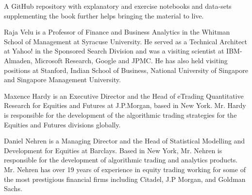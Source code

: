 \noindent A GitHub repository with explanatory and exercise notebooks and data-sets supplementing the book further helps bringing the material to live. \twomedskip


\noindent Raja Velu is a Professor of Finance and Business Analytics in the Whitman School of Management at Syracuse University. He served as a Technical Architect at Yahoo! in the Sponsored Search Division and was a visiting scientist at IBM-Almaden, Microsoft Research, Google and JPMC. He has also held visiting positions at Stanford, Indian School of Business, National University of Singapore and Singapore Management University. \medskip

\noindent Maxence Hardy is an Executive Director and the Head of eTrading Quantitative Research for Equities and Futures at J.P.Morgan, based in New York. Mr. Hardy is responsible for the development of the algorithmic trading strategies for the Equities and Futures divisions globally. \medskip

\noindent Daniel Nehren is a Managing Director and the Head of Statistical Modelling and Development for Equities at Barclays. Based in New York, Mr. Nehren is responsible for the development of algorithmic trading and analytics products. Mr. Nehren has over 19 years of experience in equity trading working for some of the most prestigious financial firms including Citadel, J.P Morgan, and Goldman Sachs. 